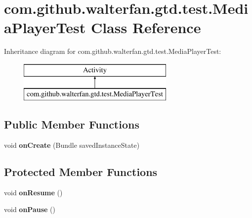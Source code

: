 \hypertarget{classcom_1_1github_1_1walterfan_1_1gtd_1_1test_1_1MediaPlayerTest}{\section{com.\-github.\-walterfan.\-gtd.\-test.\-Media\-Player\-Test Class Reference}
\label{classcom_1_1github_1_1walterfan_1_1gtd_1_1test_1_1MediaPlayerTest}
}
Inheritance diagram for com.\-github.\-walterfan.\-gtd.\-test.\-Media\-Player\-Test\-:\begin{figure}[H]
\begin{center}
\leavevmode
\includegraphics[height=2.000000cm]{classcom_1_1github_1_1walterfan_1_1gtd_1_1test_1_1MediaPlayerTest}
\end{center}
\end{figure}
\subsection*{Public Member Functions}
\begin{DoxyCompactItemize}
\item 
\hypertarget{classcom_1_1github_1_1walterfan_1_1gtd_1_1test_1_1MediaPlayerTest_ad389f3ded89f9ff8e75452b1d9b0bc69}{void {\bfseries on\-Create} (Bundle saved\-Instance\-State)}\label{classcom_1_1github_1_1walterfan_1_1gtd_1_1test_1_1MediaPlayerTest_ad389f3ded89f9ff8e75452b1d9b0bc69}

\end{DoxyCompactItemize}
\subsection*{Protected Member Functions}
\begin{DoxyCompactItemize}
\item 
\hypertarget{classcom_1_1github_1_1walterfan_1_1gtd_1_1test_1_1MediaPlayerTest_a44e33f6f5ff79882cc4f494d06466c0b}{void {\bfseries on\-Resume} ()}\label{classcom_1_1github_1_1walterfan_1_1gtd_1_1test_1_1MediaPlayerTest_a44e33f6f5ff79882cc4f494d06466c0b}

\item 
\hypertarget{classcom_1_1github_1_1walterfan_1_1gtd_1_1test_1_1MediaPlayerTest_a5b02349548c133a1a14b0955158680a9}{void {\bfseries on\-Pause} ()}\label{classcom_1_1github_1_1walterfan_1_1gtd_1_1test_1_1MediaPlayerTest_a5b02349548c133a1a14b0955158680a9}

\end{DoxyCompactItemize}


